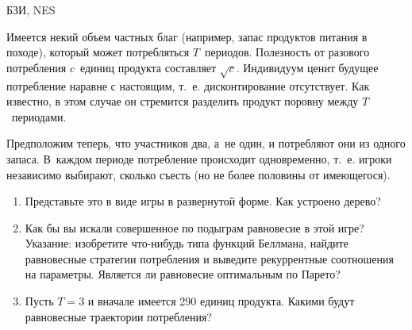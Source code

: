 \begin{problem}
\begin{source}
БЗИ, NES
\end{source} 

Имеется некий объем частных благ (например,
запас продуктов питания в походе), который может
потребляться $T$~периодов. Полезность от разового
потребления $c$~единиц продукта составляет $\sqrt{c}$.
Индивидуум ценит будущее потребление наравне с настоящим,
т.~е. дисконтирование отсутствует. Как известно, в этом
случае он стремится разделить продукт поровну между
$T$~периодами.

Предположим теперь, что участников два, а~не один, и
потребляют они из одного запаса. В~каждом периоде
потребление происходит одновременно, т.~е. игроки
независимо выбирают, сколько съесть (но не более половины
от имеющегося).

\begin{enumerate}

\item Представьте это в виде игры в развернутой форме. Как
устроено дерево?

\item Как бы вы искали совершенное по подыграм равновесие в
этой игре? Указание: изобретите что-нибудь типа функций
Беллмана, найдите равновесные стратегии потребления и
выведите рекуррентные соотношения на параметры. Является ли
равновесие оптимальным по Парето?

\item Пусть $T=3$ и вначале имеется 290 единиц продукта.
Какими будут равновесные траектории потребления?

\end{enumerate}







\begin{sol}

\end{sol}
\end{problem}





